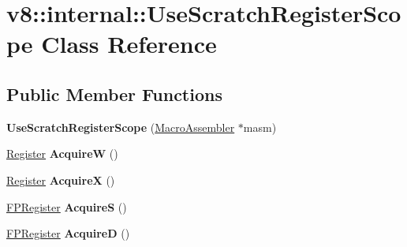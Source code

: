 \hypertarget{classv8_1_1internal_1_1_use_scratch_register_scope}{}\section{v8\+:\+:internal\+:\+:Use\+Scratch\+Register\+Scope Class Reference}
\label{classv8_1_1internal_1_1_use_scratch_register_scope}
\subsection*{Public Member Functions}
\begin{DoxyCompactItemize}
\item 
{\bfseries Use\+Scratch\+Register\+Scope} (\hyperlink{classv8_1_1internal_1_1_macro_assembler}{Macro\+Assembler} $\ast$masm)\hypertarget{classv8_1_1internal_1_1_use_scratch_register_scope_a8b833fc14b6a172c3ecb6989dbd35efc}{}\label{classv8_1_1internal_1_1_use_scratch_register_scope_a8b833fc14b6a172c3ecb6989dbd35efc}

\item 
\hyperlink{structv8_1_1internal_1_1_register}{Register} {\bfseries AcquireW} ()\hypertarget{classv8_1_1internal_1_1_use_scratch_register_scope_a634fe38400d85d4aa2cdfb3f746b1ed3}{}\label{classv8_1_1internal_1_1_use_scratch_register_scope_a634fe38400d85d4aa2cdfb3f746b1ed3}

\item 
\hyperlink{structv8_1_1internal_1_1_register}{Register} {\bfseries AcquireX} ()\hypertarget{classv8_1_1internal_1_1_use_scratch_register_scope_a238d42ff6eebfa45e67638b3969f2d5f}{}\label{classv8_1_1internal_1_1_use_scratch_register_scope_a238d42ff6eebfa45e67638b3969f2d5f}

\item 
\hyperlink{structv8_1_1internal_1_1_f_p_register}{F\+P\+Register} {\bfseries AcquireS} ()\hypertarget{classv8_1_1internal_1_1_use_scratch_register_scope_aec2a869ca80afe6b66905b1213354cc4}{}\label{classv8_1_1internal_1_1_use_scratch_register_scope_aec2a869ca80afe6b66905b1213354cc4}

\item 
\hyperlink{structv8_1_1internal_1_1_f_p_register}{F\+P\+Register} {\bfseries AcquireD} ()\hypertarget{classv8_1_1internal_1_1_use_scratch_register_scope_aef5f4d70a09d72ac0e8230b90df1af5d}{}\label{classv8_1_1internal_1_1_use_scratch_register_scope_aef5f4d70a09d72ac0e8230b90df1af5d}


\end{DoxyCompactItemize}
